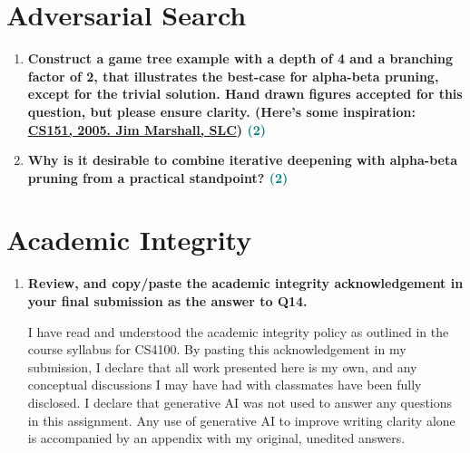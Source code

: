 \documentclass[a4paper]{article}
\begin{document}
\begin{sloppypar}
\begin{enumerate}[start=9,label=Q\arabic*,left=0pt]
    \par 

\end{enumerate}

\section{Adversarial Search}

\begin{enumerate}[start=12,label=Q\arabic*,left=0pt]
    \item \textbf{Construct a game tree example with a depth of 4 and a branching factor of 2, that illustrates the best-case for alpha-beta pruning, except for the trivial solution. Hand drawn figures accepted for this question, but please ensure clarity. 
    (Here's some inspiration: \href{https://science.slc.edu/~jmarshall/courses/2005/fall/cs151/lectures/minimax/BestCase.html}{CS151, 2005. Jim Marshall, SLC}) \hfill \textcolor{teal}{(2)}}

    \item \textbf{Why is it desirable to combine iterative deepening with alpha-beta pruning from a practical standpoint? \hfill \textcolor{teal}{(2)}}
    
    \par 

\end{enumerate}

\section{Academic Integrity}

\begin{enumerate}[start=14,label=Q\arabic*,left=0pt]
    \item \textbf{Review, and copy/paste the academic integrity acknowledgement in your final submission as the answer to Q14.}
    \par I have read and understood the academic integrity policy as outlined in the course syllabus for CS4100. 
    By pasting this acknowledgement in my submission, I declare that all work presented here is my own, 
    and any conceptual discussions I may have had with classmates have been fully disclosed. I declare that generative AI 
    was not used to answer any questions in this assignment. Any use of generative AI to improve writing clarity 
    alone is accompanied by an appendix with my original, unedited answers.
\end{enumerate}
\end{sloppypar}



\end{document}
